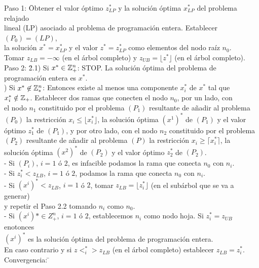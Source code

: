 \documentclass[PM.tex]{subfiles}
\begin{document}
\begin{tabbing}


Paso 1: \= Obtener el valor óptimo $z_{LP}^*$ y la solución óptima $x_{LP}^*$ del problema relajado\\ \> lineal (LP) asociado al problema de programación entera. Establecer $(P_0)=(LP)$,\\ \> la solución $x^*=x^*_{LP}$ y el valor $z^*=z^*_{LP}$ como elementos del nodo raíz $n_0$.\\ \> Tomar $z_{LB}=-\infty$ (en el árbol completo) y $z_{UB}=\lfloor z^*\rfloor$ (en el árbol completo).\\

Paso 2: \= 2.1) Si $x^*\in\mathbb{Z}_+^n$: STOP. La solución óptima del problema de programación entera es $x^*$. \\ ) Si $x^*\not\in\mathbb{Z}_*^n$: Entonces existe al menos una componente $x^*_i$ de $x^*$ tal que\\ \> $x^*_i\notin\mathbb{Z}_+$. Establecer dos ramas que conecten el nodo $n_0$, por un lado, con\\ \> el nodo $n_1$ constituido por el problema $(P_1)$ resultante de añadir al problema\\ \> $(P_0)$ la restricción $x_i\leq\lfloor x^*_i\rfloor$, la solución óptima $(x^1)^*$ de $(P_1)$ y el valor\\ \> óptimo $z^*_1$ de $(P_1)$, y por otro lado, con el nodo $n_2$ constituido por el problema\\ \> $(P_2)$ resultante de añadir al problema $(P)$ la restricción $x_i\geq\lceil x^*_i\rceil$, la\\ \> solución óptima $(x^2)^*$ de $(P_2)$ y el valor óptimo $z^*_2$ de $(P_2)$. \\ \>
- Si $(P_i)$, $i=1$ ó $2$, es infacible podamos la rama que conecta $n_0$ con $n_i$.\\ \>
- Si $z^*_i<z_{LB}$, $i=1$ ó $2$, podamos la rama que conecta $n_0$ con $n_i$.\\ \>
- Si $(x^i)^*<z_{LB}$, $i=1$ ó $2$, tomar $z_{LB}=\lfloor z^*_i\rfloor$ (en el subárbol que se va a generar)\\ \> y repetir el Paso 2.2 tomando $n_i$ como $n_0$. \\ \>
- Si $(x^i)*\in Z^n_+$, $i=1$ ó $2$, establecemos $n_i$ como nodo hoja. Si $z_i^*=z_{UB}$ enotonces\\ \> $(x^i)^*$ es la solución óptima del problema de programación entera.\\ \> En caso contrario y si $z<^*_i>z_{LB}$ (en el árbol completo) establecer $z_{LB}=z_i^*$.\\
Convergencia: \=
\end{tabbing}
\end{document}
